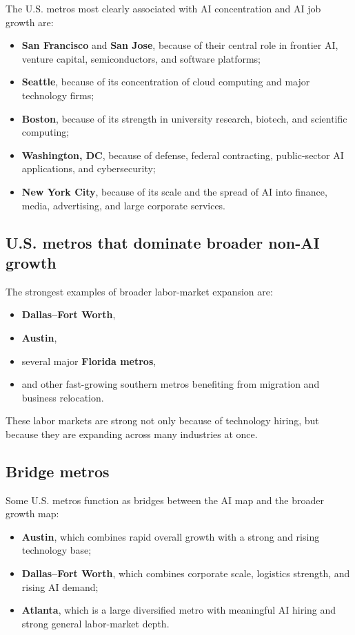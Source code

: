 \documentclass[12pt,a4paper]{article}
\begin{document}
The U.S. metros most clearly associated with AI concentration and AI job growth are:

\begin{itemize}
    \item \textbf{San Francisco} and \textbf{San Jose}, because of their central role in frontier AI, venture capital, semiconductors, and software platforms;
    \item \textbf{Seattle}, because of its concentration of cloud computing and major technology firms;
    \item \textbf{Boston}, because of its strength in university research, biotech, and scientific computing;
    \item \textbf{Washington, DC}, because of defense, federal contracting, public-sector AI applications, and cybersecurity;
    \item \textbf{New York City}, because of its scale and the spread of AI into finance, media, advertising, and large corporate services.
\end{itemize}

\subsection{U.S. metros that dominate broader non-AI growth}

The strongest examples of broader labor-market expansion are:

\begin{itemize}
    \item \textbf{Dallas--Fort Worth},
    \item \textbf{Austin},
    \item several major \textbf{Florida metros},
    \item and other fast-growing southern metros benefiting from migration and business relocation.
\end{itemize}

These labor markets are strong not only because of technology hiring, but because they are expanding across many industries at once.

\subsection{Bridge metros}

Some U.S. metros function as bridges between the AI map and the broader growth map:

\begin{itemize}
    \item \textbf{Austin}, which combines rapid overall growth with a strong and rising technology base;
    \item \textbf{Dallas--Fort Worth}, which combines corporate scale, logistics strength, and rising AI demand;
    \item \textbf{Atlanta}, which is a large diversified metro with meaningful AI hiring and strong general labor-market depth.
\end{itemize}
\end{document}
